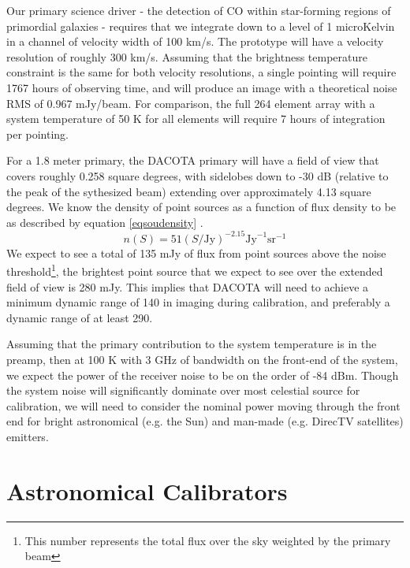 \documentclass[preprint]{aastex}
\begin{document}
Our primary science driver - the detection of CO within star-forming regions of primordial galaxies - requires that we integrate down to a level of 1 microKelvin in a channel of velocity width of 100 km/s. The prototype will have a velocity resolution of roughly 300 km/s. Assuming that the brightness temperature constraint is the same for both velocity resolutions, a single pointing will require 1767 hours of observing time, and will produce an image with a theoretical noise RMS of 0.967 mJy/beam. For comparison, the full 264 element array with a system temperature of 50 K for all elements will require 7 hours of integration per pointing.

For a 1.8 meter primary, the DACOTA primary will have a field of view that covers roughly 0.258 square degrees, with sidelobes down to -30 dB (relative to the peak of the sythesized beam) extending over approximately 4.13 square degrees. We know the density of point sources as a function of flux density to be as described by equation \ref{eqsoudensity} \citep{MNR20109C}.
\begin{equation} \label{eqsoudensity}
n(S)=51 (S/\text{Jy})^{-2.15} \text{Jy}^{-1} \text{sr}^{-1}
\end{equation}
We expect to see a total of 135 mJy of flux from point sources above the noise threshold\footnote{This number represents the total flux over the sky weighted by the primary beam}, the brightest point source that we expect to see over the extended field of view is 280 mJy. This implies that DACOTA will need to achieve a minimum dynamic range of 140 in imaging during calibration, and preferably a dynamic range of at least 290.

Assuming that the primary contribution to the system temperature is in the preamp, then at 100 K with 3 GHz of bandwidth on the front-end of the system, we expect the power of the receiver noise to be on the order of -84 dBm. Though the system noise will significantly dominate over most celestial source for calibration, we will need to consider the nominal power moving through the front end for bright astronomical (e.g. the Sun) and man-made (e.g. DirecTV satellites) emitters.
\section{Astronomical Calibrators}\label{seccalibrate}
\end{document}
